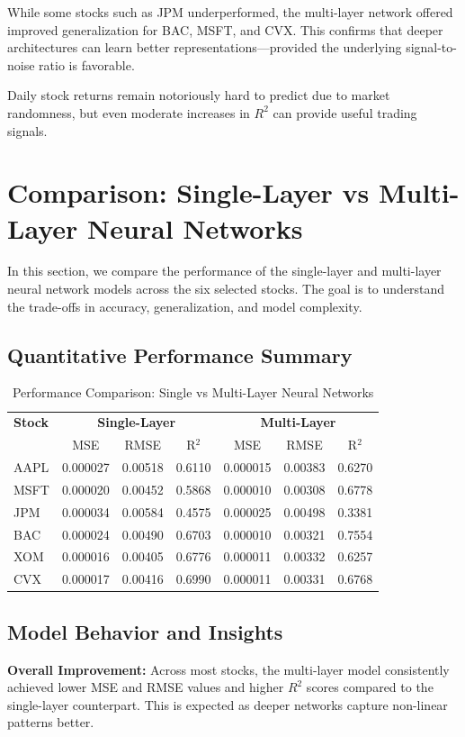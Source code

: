 \documentclass[12pt]{article}
\begin{document}
While some stocks such as JPM underperformed, the multi-layer network offered improved generalization for BAC, MSFT, and CVX. This confirms that deeper architectures can learn better representations—provided the underlying signal-to-noise ratio is favorable.

Daily stock returns remain notoriously hard to predict due to market randomness, but even moderate increases in $R^2$ can provide useful trading signals.
\section{Comparison: Single-Layer vs Multi-Layer Neural Networks}

In this section, we compare the performance of the single-layer and multi-layer neural network models across the six selected stocks. The goal is to understand the trade-offs in accuracy, generalization, and model complexity.

\subsection{Quantitative Performance Summary}
\begin{table}[h!]
\centering
\begin{tabular}{lcccccc}
\toprule
\textbf{Stock} & \multicolumn{3}{c}{\textbf{Single-Layer}} & \multicolumn{3}{c}{\textbf{Multi-Layer}} \\
\cmidrule(lr){2-4} \cmidrule(lr){5-7}
 & MSE & RMSE & R$^2$ & MSE & RMSE & R$^2$ \\
\midrule
AAPL & 0.000027 & 0.00518 & 0.6110 & 0.000015 & 0.00383 & 0.6270 \\
MSFT & 0.000020 & 0.00452 & 0.5868 & 0.000010 & 0.00308 & 0.6778 \\
JPM  & 0.000034 & 0.00584 & 0.4575 & 0.000025 & 0.00498 & 0.3381 \\
BAC  & 0.000024 & 0.00490 & 0.6703 & 0.000010 & 0.00321 & 0.7554 \\
XOM  & 0.000016 & 0.00405 & 0.6776 & 0.000011 & 0.00332 & 0.6257 \\
CVX  & 0.000017 & 0.00416 & 0.6990 & 0.000011 & 0.00331 & 0.6768 \\
\bottomrule
\end{tabular}
\caption{Performance Comparison: Single vs Multi-Layer Neural Networks}
\end{table}

\subsection{Model Behavior and Insights}
\textbf{Overall Improvement:} Across most stocks, the multi-layer model consistently achieved lower MSE and RMSE values and higher $R^2$ scores compared to the single-layer counterpart. This is expected as deeper networks capture non-linear patterns better.
\end{document}
